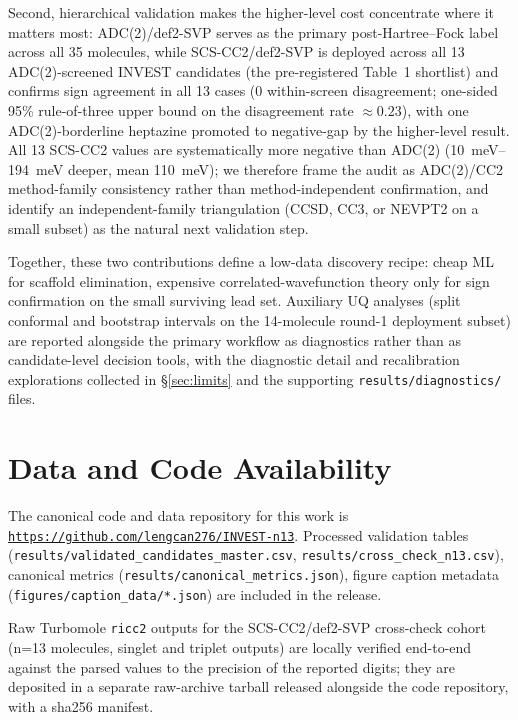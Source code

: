 \documentclass[journal=jcisd8,manuscript=article]{achemso}
\begin{document}
Second, hierarchical validation makes the higher-level cost concentrate where it matters most: ADC(2)/def2-SVP serves as the primary post-Hartree--Fock label across all 35 molecules, while SCS-CC2/def2-SVP is deployed across all 13 ADC(2)-screened INVEST candidates (the pre-registered Table~1 shortlist) and confirms sign agreement in all 13 cases (0 within-screen disagreement; one-sided 95\% rule-of-three upper bound on the disagreement rate $\approx 0.23$), with one ADC(2)-borderline heptazine promoted to negative-gap by the higher-level result. All 13 SCS-CC2 values are systematically more negative than ADC(2) (\SIrange{10}{194}{meV} deeper, mean \SI{110}{meV}); we therefore frame the audit as ADC(2)/CC2 method-family consistency rather than method-independent confirmation, and identify an independent-family triangulation (CCSD, CC3, or NEVPT2 on a small subset) as the natural next validation step.

Together, these two contributions define a low-data discovery recipe: cheap ML for scaffold elimination, expensive correlated-wavefunction theory only for sign confirmation on the small surviving lead set. Auxiliary UQ analyses (split conformal and bootstrap intervals on the 14-molecule round-1 deployment subset) are reported alongside the primary workflow as diagnostics rather than as candidate-level decision tools, with the diagnostic detail and recalibration explorations collected in \S\ref{sec:limits} and the supporting \texttt{results/diagnostics/} files.


\section*{Data and Code Availability}

The canonical code and data repository for this work is
\href{https://github.com/lengcan276/INVEST-n13}{\texttt{https://github.com/lengcan276/INVEST-n13}}.
Processed validation tables (\texttt{results/validated\_candidates\_master.csv},
\texttt{results/cross\_check\_n13.csv}), canonical metrics
(\texttt{results/canonical\_metrics.json}), figure caption metadata
(\texttt{figures/caption\_data/*.json}) are included in the release.

Raw Turbomole \texttt{ricc2} outputs for the SCS-CC2/def2-SVP cross-check
cohort (n=13 molecules, singlet and triplet outputs) are locally
verified end-to-end against the parsed values to the precision of the
reported digits; they are deposited in a separate raw-archive tarball
released alongside the code repository, with a sha256 manifest.
\end{document}
